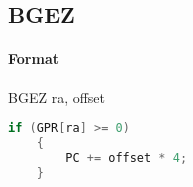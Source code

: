 \subsection{BGEZ}


\paragraph{Format} BGEZ ra, offset

\begin{lstlisting}[language=c]
    if (GPR[ra] >= 0)
    {
        PC += offset * 4;
    }
\end{lstlisting}
